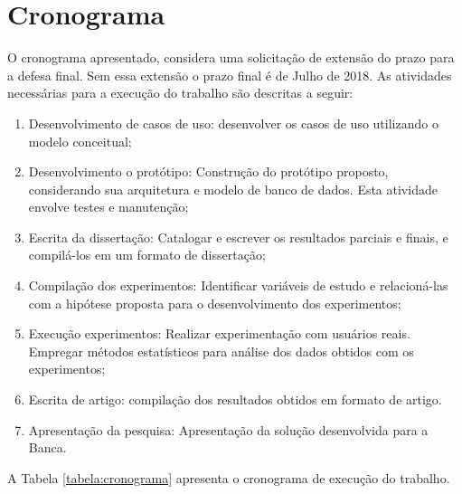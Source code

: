 \chapter{Cronograma}

  O cronograma apresentado, considera uma solicitação de extensão do prazo para a defesa final. Sem essa extensão o prazo final é de Julho de 2018. As atividades necessárias para a execução do trabalho são descritas a seguir:
	
\begin{enumerate}	
	\item Desenvolvimento de casos de uso: desenvolver os casos de uso utilizando o modelo conceitual; \label{atividade1}
	
	\item Desenvolvimento o protótipo: Construção do protótipo proposto, considerando sua arquitetura e modelo de banco de dados. Esta atividade envolve testes e manutenção; \label{atividade2}
	
	\item Escrita da dissertação: Catalogar e escrever os resultados parciais e finais, e compilá-los em um formato de dissertação; \label{atividade3}
	
	\item Compilação dos experimentos: Identificar variáveis de estudo e relacioná-las com a hipótese proposta para o desenvolvimento dos experimentos; \label{atividade4}
	
	\item Execução experimentos: Realizar experimentação com usuários reais. Empregar métodos estatísticos para análise dos dados obtidos com os experimentos; \label{atividade5}
	
	\item Escrita de artigo: compilação dos resultados obtidos em formato de artigo. \label{atividade6}
	
	\item Apresentação da pesquisa: Apresentação da solução desenvolvida para a Banca. \label{atividade7}
	
\end{enumerate}

A Tabela \ref{tabela:cronograma} apresenta o cronograma de execução do trabalho.


